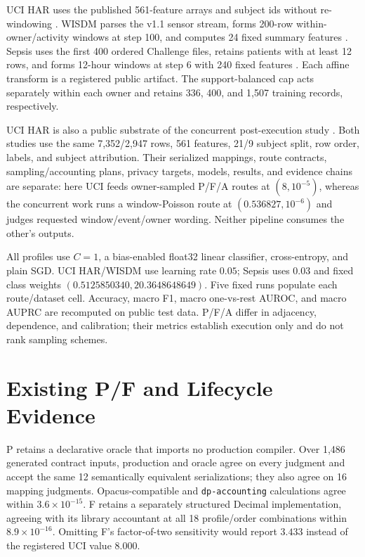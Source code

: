 \documentclass[letterpaper]{article}
\begin{document}
UCI HAR uses the published 561-feature arrays and subject ids without
re-windowing \citep{anguita2013har,ucihar2013dataset}.  WISDM parses the v1.1 sensor stream,
forms 200-row within-owner/activity windows at step 100, and computes 24 fixed
summary features \citep{kwapisz2011activity}.  Sepsis uses the first 400
ordered Challenge files, retains patients with at least 12 rows, and forms
12-hour windows at step 6 with 240 fixed features
\citep{physionet2019sepsis,reyna2020sepsis,pollard2026physionet,goldberger2000physionet}.  Each affine transform is a
registered public artifact.  The support-balanced cap acts separately within
each owner and retains 336, 400, and 1,507 training records, respectively.

UCI HAR is also a public substrate of the concurrent post-execution study
\citep{anonymous2026audit}.  Both studies use the same 7,352/2,947 rows,
561 features, 21/9 subject split, row order, labels, and subject attribution.
Their serialized mappings, route contracts, sampling/accounting plans,
privacy targets, models, results, and evidence chains are separate: here UCI
feeds owner-sampled P/F/A routes at $(8,10^{-5})$, whereas the concurrent work
runs a window-Poisson route at $(0.536827,10^{-6})$ and judges requested
window/event/owner wording.  Neither pipeline consumes the other's outputs.



All profiles use $C=1$, a bias-enabled float32 linear classifier,
cross-entropy, and plain SGD.  UCI HAR/WISDM use learning rate $0.05$; Sepsis
uses $0.03$ and fixed class weights
$(0.5125850340,20.3648648649)$.  Five fixed runs populate each route/dataset
cell.  Accuracy, macro F1, macro one-vs-rest AUROC, and macro AUPRC are
recomputed on public test data.  P/F/A differ in adjacency, dependence, and
calibration; their metrics establish execution only and do not rank sampling
schemes.

\section{Existing P/F and Lifecycle Evidence}

P retains a declarative oracle that imports no production compiler.  Over
1,486 generated contract inputs, production and oracle agree on every
judgment and accept the same 12 semantically equivalent serializations; they
also agree on 16 mapping judgments.  Opacus-compatible and
\texttt{dp-accounting} calculations \citep{yousefpour2021opacus,dpaccounting} agree within
$3.6{\times}10^{-15}$.  F retains a separately structured Decimal
implementation, agreeing with its library accountant at all 18 profile/order combinations within
$8.9{\times}10^{-16}$.  Omitting F's factor-of-two sensitivity would report
$3.433$ instead of the registered UCI value $8.000$.
\end{document}
